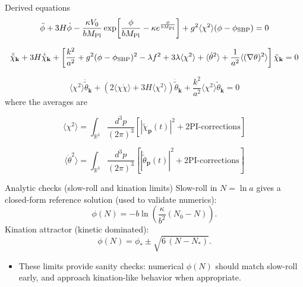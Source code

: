 \documentclass[aspectratio=169]{beamer}
\begin{document}
\begin{frame}{Derived equations}
    \begin{equation*}
    \ddot{\phi} + 3H \dot{\phi}
    - \frac{\kappa V_0}{b M_{\rm Pl}}
    \exp\!\left[\frac{\phi}{b M_{\rm Pl}} - \kappa e^{\frac{\phi}{b M_{\rm Pl}}}\right]
    + g^2 \langle \chi^2 \rangle (\phi - \phi_{\rm SBP}) = 0
    \end{equation*}

    \begin{equation*}
    \ddot{\tilde{\chi}}_{\mathbf{k}} + 3H \dot{\tilde{\chi}}_{\mathbf{k}}
    + \left[
    \frac{k^2}{a^2}
    + g^2 (\phi - \phi_{\rm SBP})^2
    - \lambda f^2
    + 3 \lambda \langle \chi^2 \rangle + \langle \dot{\theta}^2 \rangle
    + \frac{1}{a^2} \langle (\nabla \theta)^2 \rangle
    \right]
    \tilde{\chi}_{\mathbf{k}} = 0
    \end{equation*}

    \begin{equation*}
    \langle \chi^2 \rangle \ddot{\tilde{\theta}}_{\mathbf{k}}
    + (2 \langle \chi \dot{\chi} \rangle + 3H \langle \chi^2 \rangle) \dot{\tilde{\theta}}_{\mathbf{k}}
    + \frac{k^2}{a^2} \langle \chi^2 \rangle \tilde{\theta}_{\mathbf{k}} = 0
    \end{equation*}
    where the averages are

    \begin{equation*}
    \langle \chi^2 \rangle
    = \int_{\mathbb{R}^3} \frac{d^3 p}{(2\pi)^3}
    \left[ |\tilde{\chi}_{\mathbf{p}}(t)|^2 + \text{2PI-corrections} \right]
    \end{equation*}

    \begin{equation*}
    \langle \dot{\theta}^2 \rangle
    = \int_{\mathbb{R}^3} \frac{d^3 p}{(2\pi)^3}
    \left[ |\dot{\tilde{\theta}}_{\mathbf{p}}(t)|^2 + \text{2PI-corrections} \right]
    \end{equation*}
\end{frame}

\begin{frame}{Analytic checks (slow-roll and kination limits)}
Slow-roll in $N=\ln a$ gives a closed-form reference solution (used to validate numerics):
\[
\phi(N)= -b \ln\!\left(\frac{\kappa}{b^2}(N_0-N)\right).
\]
Kination attractor (kinetic dominated):
\[
\phi(N)=\phi_* \pm \sqrt{6\,(N-N_*)}.
\]
\begin{itemize}
  \item These limits provide sanity checks: numerical $\phi(N)$ should match slow-roll early, and approach kination-like behavior when appropriate.
\end{itemize}
\end{frame}
\end{document}
